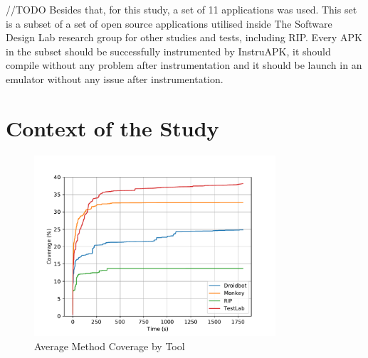 //TODO
Besides that, for this study, a set of 11 applications was used. This set is a subset of a set of open source applications utilised inside The Software Design Lab research group for other studies and tests, including RIP. Every APK in the subset should be successfully instrumented by InstruAPK, it should compile without any problem after instrumentation and it should be launch in an emulator without any issue after instrumentation.


\section{Context of the Study}


\begin{table}[t]
	\centering
	\caption{Applications used for the study}
	\label{tab:alufs}
\end{table}

\begin{figure}[h]
\centering
\includegraphics[width=0.8\textwidth]{../Figures/averageCoverageInstruAPK.pdf}
\caption{Average Method Coverage by Tool}\label{fig:averageCoverage}
\end{figure}

